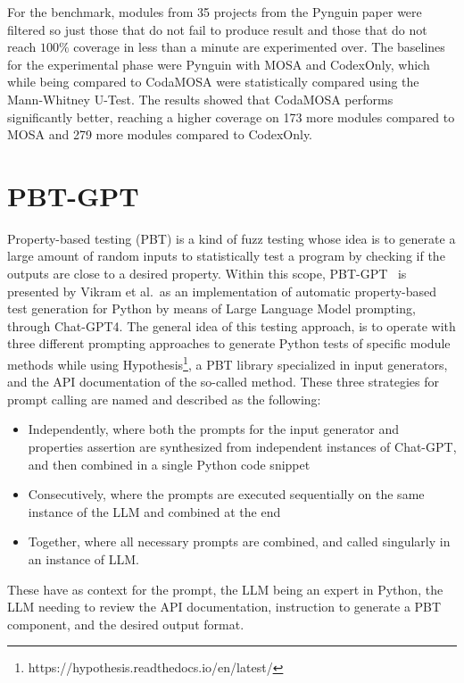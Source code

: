 \documentclass[%
  chapterprefix=false,%
  open=right,%
  twoside=true,%
  paper=a4,%
  logofile={Figures/logo.png},%
  thesistype=master,%
  UKenglish,%
]{se2thesis}
\begin{document}
For the benchmark, modules from 35 projects from the Pynguin paper were filtered so just those that do not fail to produce result and those that do not reach \(100\%\) coverage in less than a minute are experimented over.
The baselines for the experimental phase were Pynguin with MOSA and CodexOnly, which while being compared to CodaMOSA were statistically compared using the Mann-Whitney U-Test.
The results showed that CodaMOSA performs significantly better, reaching a higher coverage on 173 more modules compared to MOSA and 279 more modules compared to CodexOnly.

\section{PBT-GPT}

Property-based testing (PBT) is a kind of fuzz testing whose idea is to generate a large amount of random inputs to statistically test a program by checking if the outputs are close to a desired property.
Within this scope, PBT-GPT~\cite{DBLP:journals/corr/abs-2307-04346} is presented by Vikram et al.\ as an implementation of automatic property-based test generation for Python by means of Large Language Model prompting, through Chat-GPT4.
The general idea of this testing approach, is to operate with three different prompting approaches to generate Python tests of specific module methods while using Hypothesis\footnote{https://hypothesis.readthedocs.io/en/latest/}, a PBT library specialized in input generators, and the API documentation of the so-called method.
These three strategies for prompt calling are named and described as the following:

\begin{itemize}
  \item Independently, where both the prompts for the input generator and properties assertion are synthesized from independent instances of Chat-GPT, and then combined in a single Python code snippet
  \item Consecutively, where the prompts are executed sequentially on the same instance of the LLM and combined at the end
  \item Together, where all necessary prompts are combined, and called singularly in an instance of LLM.\@
\end{itemize}

These have as context for the prompt, the LLM being an expert in Python, the LLM needing to review the API documentation, instruction to generate a PBT component, and the desired output format.
\end{document}
